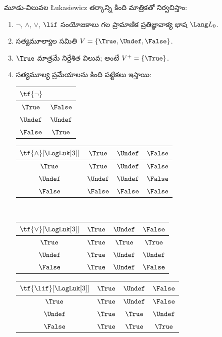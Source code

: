 \documentclass[../../../include/open-logic-section]{subfiles}
\begin{document}
\begin{defn}
మూడు-విలువల \L ukasiewicz తర్కాన్ని కింది మాత్రికతో
నిర్వచిస్తాం:
\begin{enumerate}
  \item $\lnot$, $\land$, $\lor$, $\lif$
  సంయోజకాలు గల ప్రామాణిక ప్రతిజ్ఞావాక్య భాష $\Lang L_0$.
  \item సత్యమూల్యాల సమితి $V = \{\True, \Undef, \False\}$.
  \item $\True$ మాత్రమే నిర్దేశిత విలువ; అంటే
  $V^+ = \{\True\}$.
  \item సత్యమూల్య ప్రమేయాలను కింది పట్టికలు ఇస్తాయి:
  \begin{center}
    \begin{tabular}{c|c}
      $\tf{\lnot}$ & \\
      \hline
      $\True$ & $\False$ \\
      $\Undef$ & $\Undef$ \\
      $\False$ & $\True$
    \end{tabular}
    \quad
    \begin{tabular}{c|ccc}
      $\tf{\land}[\LogLuk[3]]$ & $\True$ & $\Undef$ & $\False$ \\
      \hline
      $\True$ & $\True$ & $\Undef$ & $\False$ \\
      $\Undef$ & $\Undef$ & $\Undef$ & $\False$\\
      $\False$ & $\False$ & $\False$ & $\False$
    \end{tabular}
    \\[2ex]
    \begin{tabular}{c|ccc}
      $\tf{\lor}[\LogLuk[3]]$ & $\True$ & $\Undef$ & $\False$ \\
      \hline
      $\True$ & $\True$ & $\True$ & $\True$ \\
      $\Undef$ & $\True$ & $\Undef$ & $\Undef$ \\
      $\False$ & $\True$ & $\Undef$ & $\False$
    \end{tabular}
    \quad
    \begin{tabular}{c|ccc}
      $\tf{\lif}[\LogLuk[3]]$ & $\True$ & $\Undef$ & $\False$ \\
      \hline
      $\True$ & $\True$ & $\Undef$ & $\False$ \\
      $\Undef$ & $\True$ & $\True$ & $\Undef$  \\
      $\False$ & $\True$ & $\True$ & $\True$
    \end{tabular}
  \end{center}
\end{enumerate}
%
%
%
%
%
%
\end{defn}
\end{document}
